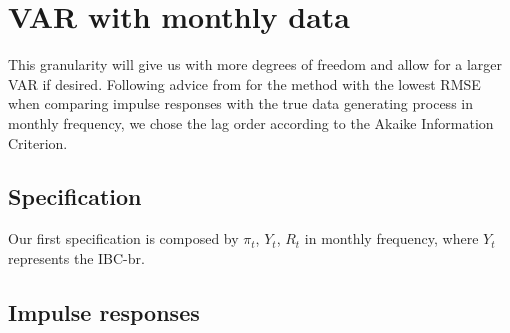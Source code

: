 \section{VAR with monthly data}
    This granularity will give us with more degrees of freedom and allow for a larger VAR if desired. Following advice from \citet{Ivanov2005} for the method with the lowest RMSE when comparing impulse responses with the true data generating process in monthly frequency, we chose the lag order according to the Akaike Information Criterion.
    \subsection{Specification}
        Our first specification is composed by \(\pi_t\), \(Y_t\), \(R_t\) in monthly frequency, where \(Y_t\) represents the IBC-br.
    
    \subsection{Impulse responses}
        \lipsum[1]
